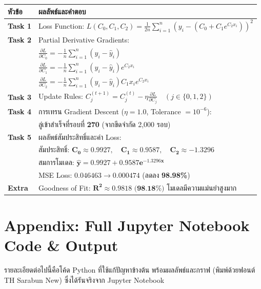 \documentclass[12pt,a4paper]{article}
\begin{document}
\begin{table}[H]
\centering
\begin{tabular}{l l}
\toprule
\textbf{หัวข้อ} & \textbf{ผลลัพธ์และคำตอบ} \\
\midrule
\textbf{Task 1} & Loss Function: $L(C_0, C_1, C_2) = \frac{1}{2n} \sum_{i=1}^{n} \left( y_i - (C_0 + C_1 e^{C_2 x_i}) \right)^2$ \\[4pt]
\textbf{Task 2} & Partial Derivative Gradients: \\
                & \quad $\frac{\partial L}{\partial C_0} = -\frac{1}{n} \sum_{i=1}^{n} (y_i - \hat{y}_i)$ \\[2pt]
                & \quad $\frac{\partial L}{\partial C_1} = -\frac{1}{n} \sum_{i=1}^{n} (y_i - \hat{y}_i) e^{C_2 x_i}$ \\[2pt]
                & \quad $\frac{\partial L}{\partial C_2} = -\frac{1}{n} \sum_{i=1}^{n} (y_i - \hat{y}_i) C_1 x_i e^{C_2 x_i}$ \\[4pt]
\textbf{Task 3} & Update Rules: $C_j^{(t+1)} = C_j^{(t)} - \eta \frac{\partial L}{\partial C_j} \quad (j \in \{0, 1, 2\})$ \\[4pt]
\textbf{Task 4} & การเทรน Gradient Descent ($\eta = 1.0$, Tolerance $= 10^{-6}$): \\
                & \quad ลู่เข้าสำเร็จที่รอบที่ \textbf{270} (จากขีดจำกัด 2,000 รอบ) \\[4pt]
\textbf{Task 5} & ผลลัพธ์สัมประสิทธิ์และค่า Loss: \\
                & \quad สัมประสิทธิ์: $\mathbf{C_0 \approx 0.9927}, \quad \mathbf{C_1 \approx 0.9587}, \quad \mathbf{C_2 \approx -1.3296}$ \\
                & \quad สมการโมเดล: $\mathbf{\hat{y} = 0.9927 + 0.9587 e^{-1.3296 x}}$ \\
                & \quad MSE Loss: $0.046463 \rightarrow \mathbf{0.000474}$ (ลดลง \textbf{98.98\%}) \\[4pt]
\textbf{Extra}  & Goodness of Fit: $\mathbf{R^2 \approx 0.9818 \text{ (98.18\%)}}$ โมเดลมีความแม่นยำสูงมาก \\
\bottomrule
\end{tabular}
\end{table}

\clearpage

\section*{Appendix: Full Jupyter Notebook Code \& Output}

รายละเอียดต่อไปนี้คือโค้ด Python ที่ใช้แก้ปัญหาข้างต้น พร้อมผลลัพธ์และกราฟ (พิมพ์ด้วยฟอนต์ TH Sarabun New) ซึ่งได้รันจริงจาก Jupyter Notebook


\end{document}
